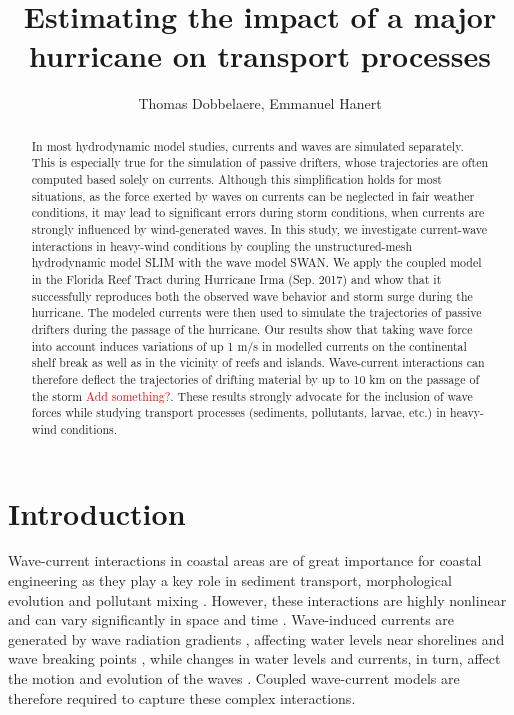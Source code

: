 \documentclass[11pt,a4paper]{article}
\title{Estimating the impact of a major hurricane on transport processes}
\author{Thomas Dobbelaere, Emmanuel Hanert}
\begin{document}
\maketitle
\begin{abstract}
In most hydrodynamic model studies, currents and waves are simulated separately. This is especially true for the simulation of passive drifters, whose trajectories are often computed based solely on currents. Although this simplification holds for most situations, as the force exerted by waves on currents can be neglected in fair weather conditions, it may lead to significant errors during storm conditions, when currents are strongly influenced by wind-generated waves. In this study, we investigate current-wave interactions in heavy-wind conditions by coupling the unstructured-mesh hydrodynamic model SLIM with the wave model SWAN. We apply the coupled model in the Florida Reef Tract during Hurricane Irma (Sep. 2017) and whow that it successfully reproduces both the observed wave behavior and storm surge during the hurricane. The modeled currents were then used to simulate the trajectories of passive drifters during the passage of the hurricane. Our results show that taking wave force into account induces variations of up 1 m/s in modelled currents on the continental shelf break as well as in the vicinity of reefs and islands. Wave-current interactions can therefore deflect the trajectories of drifting material by up to 10 km on the passage of the storm \textcolor{red}{Add something?}. These results strongly advocate for the inclusion of wave forces while studying transport processes (sediments, pollutants, larvae, etc.) in heavy-wind conditions. 

\end{abstract}

\section{Introduction}

Wave-current interactions in coastal areas are of great importance for coastal engineering as they play a key role in sediment transport, morphological evolution and pollutant mixing \citep{bever2013simulating, li1998three}. However, these interactions are highly nonlinear and can vary significantly in space and time \citep{wu2011fvcom}. Wave-induced currents are generated by wave radiation gradients \citep{longuet1970longshore}, affecting water levels near shorelines and wave breaking points \citep{longuet1964radiation}, while changes in water levels and currents, in turn, affect the motion and evolution of the waves \citep{sikiric2013coupling}. Coupled wave-current models are therefore required to capture these complex interactions.
\end{document}
